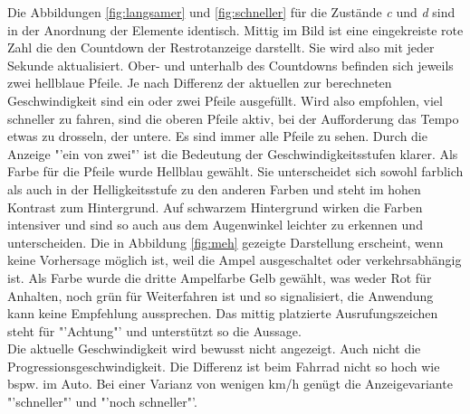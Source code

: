 Die Abbildungen \ref{fig:langsamer} und \ref{fig:schneller} für die Zustände \textit{c} und \textit{d} sind in der Anordnung der Elemente identisch. Mittig im Bild ist eine eingekreiste rote Zahl die den Countdown der Restrotanzeige darstellt. Sie wird also mit jeder Sekunde aktualisiert. Ober- und unterhalb des Countdowns befinden sich jeweils zwei hellblaue Pfeile. Je nach Differenz der aktuellen zur berechneten Geschwindigkeit sind ein oder zwei Pfeile ausgefüllt. Wird also empfohlen, viel schneller zu fahren, sind die oberen Pfeile aktiv, bei der Aufforderung das Tempo etwas zu drosseln, der untere. Es sind immer alle Pfeile zu sehen. Durch die Anzeige "'ein von zwei"' ist die Bedeutung der Geschwindigkeitsstufen klarer. Als Farbe für die Pfeile wurde Hellblau gewählt. Sie unterscheidet sich sowohl farblich als auch in der Helligkeitsstufe zu den anderen Farben und steht im hohen Kontrast zum Hintergrund. Auf schwarzem Hintergrund wirken die Farben intensiver und sind so auch aus dem Augenwinkel leichter zu erkennen und unterscheiden. Die in Abbildung \ref{fig:meh} gezeigte Darstellung erscheint, wenn keine Vorhersage möglich ist, weil die Ampel ausgeschaltet oder verkehrsabhängig ist. Als Farbe wurde die dritte Ampelfarbe Gelb gewählt, was weder Rot für Anhalten, noch grün für Weiterfahren ist und so signalisiert, die Anwendung kann keine Empfehlung aussprechen. Das mittig platzierte Ausrufungszeichen steht für "'Achtung"' und unterstützt so die Aussage.\\
Die aktuelle Geschwindigkeit wird bewusst nicht angezeigt. Auch nicht die Progressionsgeschwindigkeit. Die Differenz ist beim Fahrrad nicht so hoch wie bspw. im Auto. Bei einer Varianz von wenigen km/h genügt die Anzeigevariante "'schneller"' und "'noch schneller"'.
